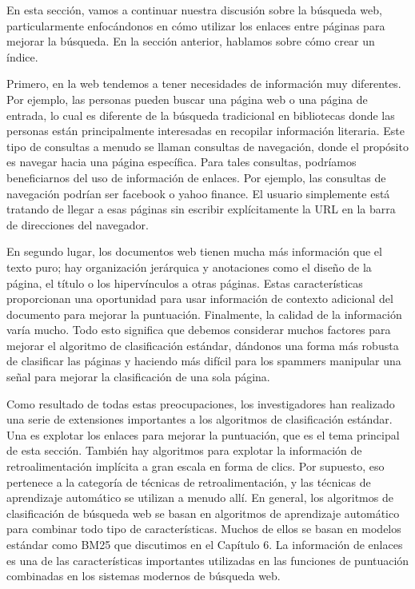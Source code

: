 En esta sección, vamos a continuar nuestra discusión sobre la búsqueda web, particularmente enfocándonos en cómo utilizar los enlaces entre páginas para mejorar la búsqueda. En la sección anterior, hablamos sobre cómo crear un índice. 

Primero, en la web tendemos a tener necesidades de información muy diferentes. Por ejemplo, las personas pueden buscar una página web o una página de entrada, lo cual es diferente de la búsqueda tradicional en bibliotecas donde las personas están principalmente interesadas en recopilar información literaria. Este tipo de consultas a menudo se llaman consultas de navegación, donde el propósito es navegar hacia una página específica. Para tales consultas, podríamos beneficiarnos del uso de información de enlaces. Por ejemplo, las consultas de navegación podrían ser facebook o yahoo finance. El usuario simplemente está tratando de llegar a esas páginas sin escribir explícitamente la URL en la barra de direcciones del navegador.

En segundo lugar, los documentos web tienen mucha más información que el texto puro; hay organización jerárquica y anotaciones como el diseño de la página, el título o los hipervínculos a otras páginas. Estas características proporcionan una oportunidad para usar información de contexto adicional del documento para mejorar la puntuación. Finalmente, la calidad de la información varía mucho. Todo esto significa que debemos considerar muchos factores para mejorar el algoritmo de clasificación estándar, dándonos una forma más robusta de clasificar las páginas y haciendo más difícil para los spammers manipular una señal para mejorar la clasificación de una sola página.

Como resultado de todas estas preocupaciones, los investigadores han realizado una serie de extensiones importantes a los algoritmos de clasificación estándar. Una es explotar los enlaces para mejorar la puntuación, que es el tema principal de esta sección. También hay algoritmos para explotar la información de retroalimentación implícita a gran escala en forma de clics. Por supuesto, eso pertenece a la categoría de técnicas de retroalimentación, y las técnicas de aprendizaje automático se utilizan a menudo allí. En general, los algoritmos de clasificación de búsqueda web se basan en algoritmos de aprendizaje automático para combinar todo tipo de características. Muchos de ellos se basan en modelos estándar como BM25 que discutimos en el Capítulo 6. La información de enlaces es una de las características importantes utilizadas en las funciones de puntuación combinadas en los sistemas modernos de búsqueda web.

